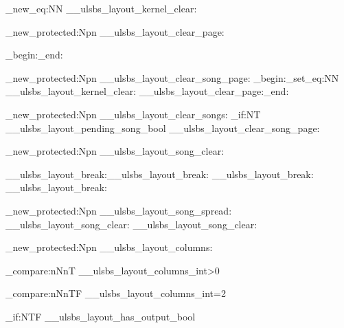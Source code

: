 \cs_new_eq:NN \__ulsbs_layout_kernel_clear: \clearpage

\cs_new_protected:Npn \__ulsbs_layout_clear_page:
  {\par{}\relax
   \group_begin:\topskip=1sp\relax\clearpage\group_end:}

\cs_new_protected:Npn \__ulsbs_layout_clear_song_page:
  {\group_begin:\cs_set_eq:NN \clearpage \__ulsbs_layout_kernel_clear:
   \__ulsbs_layout_clear_page:\group_end:}

\cs_new_protected:Npn \__ulsbs_layout_clear_songs:
  {\bool_if:NT \g__ulsbs_layout_pending_song_bool {\__ulsbs_layout_clear_song_page:}}

\cs_new_protected:Npn \__ulsbs_layout_song_clear:
  {\par
   \if@twocolumn
     \if@firstcolumn
       \__ulsbs_layout_break:\null\__ulsbs_layout_break:
     \else\__ulsbs_layout_break:\fi
   \else\__ulsbs_layout_break:\fi}

\cs_new_protected:Npn \__ulsbs_layout_song_spread:
  {\__ulsbs_layout_song_clear:
   \if@twoside\ifodd\value{page}\null\__ulsbs_layout_song_clear:\fi\fi}

\cs_new_protected:Npn \__ulsbs_layout_columns:
  {
    \int_compare:nNnT {\g__ulsbs_layout_columns_int}>{0}
    {
    \topskip=1sp\relax
    \int_compare:nNnTF {\g__ulsbs_layout_columns_int}={2}
      {\if@twocolumn\else
         \par
         \bool_if:NTF \g__ulsbs_layout_has_output_bool {\twocolumn}
           {\ifdim\pagetotal>0pt
              \dim_set:Nn \l__ulsbs_layout_prefix_height_dim {\pagetotal}
              \l__ulsbs_layout_saved_output_toks=\output
              \output{\global\setbox\g__ulsbs_layout_prefix_box=\vbox{\unvbox255}}
              \penalty-10000\relax
              \output=\l__ulsbs_layout_saved_output_toks
              \twocolumn
              \global\@colht=\dimexpr\textheight-\l__ulsbs_layout_prefix_height_dim\relax
              \global\@colroom=\@colht\global\vsize=\@colht
              \AddToHookNext{cmd/@combinedblfloats/before}
                {\setbox\@outputbox=\vbox{\unvbox\g__ulsbs_layout_prefix_box
                   \kern0pt\nointerlineskip\box\@outputbox}
                 \box_gclear:N \g__ulsbs_layout_prefix_box}
            \else\twocolumn\fi}
       \fi}
      {\if@twocolumn\onecolumn\fi}
    \topskip=0pt\relax
    }
  }

